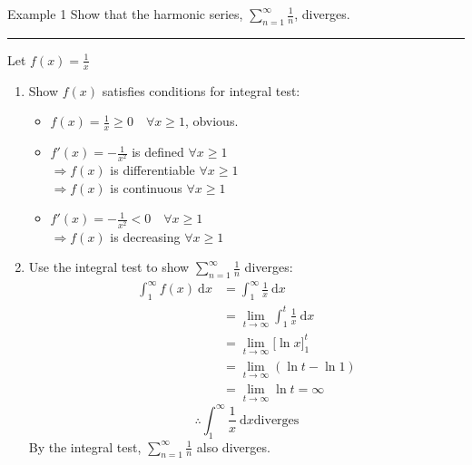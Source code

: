 \documentclass[12pt,a4paper]{article}
\def\d{{\mathrm{d}}}
\def\dx{\d x}
\begin{document}
\begin{eg}{Example 1}
	Show that the harmonic series, $\displaystyle\sum_{n=1}^\infty\frac{1}{n}$, diverges. \\
	\noindent\rule[0.25\baselineskip]{\textwidth}{1pt}
	Let $\displaystyle f(x)=\frac{1}{x}$
	\begin{enumerate}
		\item Show $f(x)$ satisfies conditions for integral test: 
		\begin{itemize}
			\item $\displaystyle f(x)=\frac{1}{x}\geq0\quad\forall x\geq 1$, obvious.
			\item $\displaystyle f'(x)=-\frac{1}{x^2}$ is defined $\forall x\geq1$\\
			$\Rightarrow f(x)$ is differentiable $\forall x\geq1$\\
			$\Rightarrow f(x)$ is continuous $\forall x\geq1$
			\item $\displaystyle f'(x)=-\frac{1}{x^2}<0\quad\forall x\geq1$\\
			$\Rightarrow f(x)$ is decreasing $\forall x\geq1$
		\end{itemize}
		\item Use the integral test to show $\displaystyle\sum_{n=1}^\infty\frac{1}{n}$ diverges: 
		$$\begin{aligned}
			\int_1^\infty f(x)\ \dx &=\int_1^\infty\frac{1}{x}\ \dx\\
			&=\lim_{t\to\infty}\int_1^t\frac{1}{x}\ \dx\\
			&=\lim_{t\to\infty}\bigg[\ln{x}\bigg]_1^t\\
			&=\lim_{t\to\infty}(\ln{t}-\ln1)\\
			&=\lim_{t\to\infty}\ln{t}=\infty
		\end{aligned}$$
		$$\therefore \int_1^\infty\frac{1}{x}\ \dx \text{diverges}$$
		By the integral test, $\displaystyle\sum_{n=1}^\infty\frac{1}{n}$ also diverges.
	\end{enumerate}
\end{eg}
\end{document}
